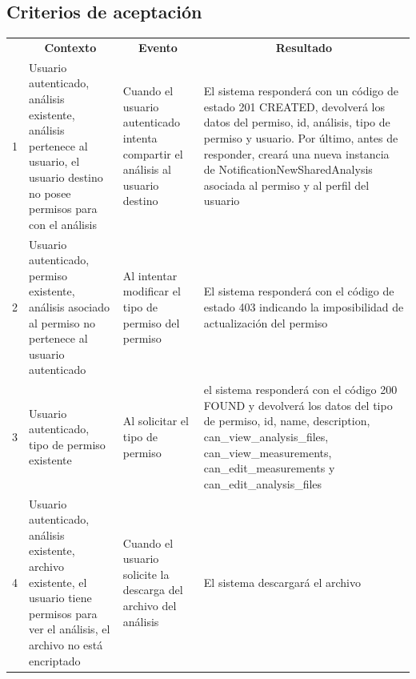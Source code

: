 \subsection{Criterios de aceptación}

\begin{center}
\begin{longtable}{|p{0.7cm}|p{4cm}|p{4cm}|p{5cm}| }

	\hline 
		\rowcolor[gray]{0.9} 
		\multicolumn{4}{|c|}{\textbf{Criterio de aceptación}} \\
	\hline
    	\rowcolor[gray]{0.9} 
    	\multicolumn{1}{|c}{\textbf{Id}} & \multicolumn{1}{|c}{\textbf{Contexto}} &  \multicolumn{1}{|c}{\textbf{Evento}} & \multicolumn{1}{|c|}{\textbf{Resultado}} \\
    \hline
    	
1&Usuario autenticado, análisis existente, análisis pertenece al usuario, el usuario destino no posee permisos para con el análisis & Cuando el usuario autenticado intenta compartir el análisis al usuario destino & El sistema responderá con un código de estado 201 CREATED, devolverá los datos del permiso, id, análisis, tipo de permiso y usuario. Por último, antes de responder, creará una nueva instancia de NotificationNewSharedAnalysis asociada al permiso y al perfil del usuario\\  \hline
 
2& Usuario autenticado, permiso existente, análisis asociado al permiso no pertenece al usuario autenticado   & Al intentar modificar el tipo de permiso del permiso & El sistema responderá con el código de estado 403 indicando la imposibilidad de actualización del permiso\\ \hline

3& Usuario autenticado, tipo de permiso existente & Al solicitar el tipo de permiso & el sistema responderá con el código 200 FOUND y devolverá los datos del tipo de permiso, id, name, description, can\_view\_analysis\_files, can\_view\_measurements, can\_edit\_measurements y can\_edit\_analysis\_files\\ \hline

4& Usuario autenticado, análisis existente, archivo existente, el usuario tiene permisos para ver el análisis, el archivo no está encriptado & Cuando el usuario solicite la descarga del archivo del análisis & El sistema descargará el archivo\\ \hline


\end{longtable}
\end{center}
